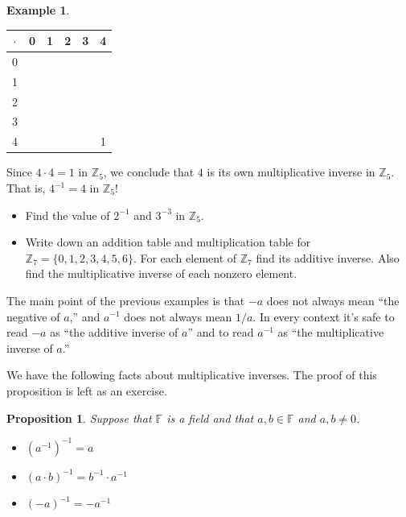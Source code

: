\documentclass[11pt]{article}
\newenvironment{task}
	{\begin{mdframed}[linecolor=lightgray, linewidth=3pt]\raggedright}
	{\end{mdframed}}
\newtheorem{proposition}[theorem]{Proposition}
\theoremstyle{definition}
\newtheorem{example}[theorem]{Example}
\begin{document}
\begin{example}
  \begin{center}
    \begin{tabular}{|c|c|c|c|c|c|}\\ \hline
      $\cdot$ & 0 & 1 & 2 & 3 & 4 \\ \hline
      0   &   &   &   &   &   \\ \hline
      1   &   &   &   &   &   \\ \hline
      2   &   &   &   &   &   \\ \hline
      3   &   &   &   &   &   \\ \hline
      4   &   &   &   &   & 1 \\ \hline
    \end{tabular}
  \end{center}

  Since $4\cdot 4 = 1$ in $\mathbb{Z}_5$, we conclude that $4$ is its own multiplicative inverse in $\mathbb{Z}_5$. That is, $4^{-1}=4$ in $\mathbb{Z}_5$!

  \begin{task}
    \begin{itemize}
      \item Find the value of $2^{-1}$ and $3^{-3}$ in $\mathbb{Z}_5$.
    \end{itemize}
  \end{task}

\end{example}

\begin{task}
  \begin{itemize}
    \item Write down an addition table and multiplication table for $\mathbb{Z}_7 = \{0, 1, 2, 3, 4, 5, 6 \}$. For each element of $\mathbb{Z}_7$ find
      its additive inverse. Also find the multiplicative inverse of each nonzero element.
  \end{itemize}
\end{task}

The main point of the previous examples is that $-a$ does not always mean ``the negative of $a$,'' and $a^{-1}$ does not always mean $1/a$. In every context
it's safe to read $-a$ as ``the additive inverse of $a$'' and to read $a^{-1}$ as ``the multiplicative inverse of $a$.''

We have the following facts about multiplicative inverses. The proof of this proposition is left as an exercise.

\begin{proposition} Suppose that $\mathbb{F}$ is a field and that $a,b\in\mathbb{F}$ and $a,b\neq 0$.
  \begin{itemize}
    \item[(a)] $(a^{-1})^{-1} = a$
    \item[(b)] $(a\cdot b)^{-1}=b^{-1}\cdot a^{-1}$
    \item[(c)] $(-a)^{-1} = -a^{-1}$
  \end{itemize}\label{prop: multiplicative inverses}
\end{proposition}
\end{document}
